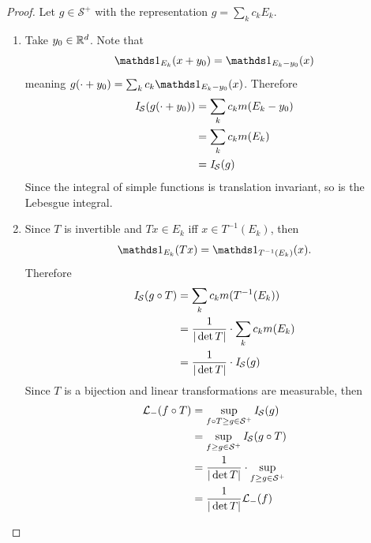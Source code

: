 \documentclass[hw_all.tex]{subfiles}
\begin{document}
\begin{proof}
    Let $g \in \mathcal{S}^+$ with the representation $g = \sum_{k} c_k E_k$.
    \begin{enumerate}
        \item
            Take $y_0 \in \mathbb{R}^d$. Note that
            \[
                \ind{E_k}(x + y_0) = \ind{E_k - y_0}(x)
            \]
            meaning $g(\cdot + y_0) = \sum_k c_k \ind{E_k - y_0}(x)$. Therefore
            \begin{align*}
                \mathit{I}_{\mathcal{S}}(g(\cdot + y_0)) &= \sum_k c_k m(E_k - y_0) \\
                &= \sum_k c_k m(E_k) \\
                &= \mathit{I}_{\mathcal{S}}(g)
            \end{align*}
            Since the integral of simple functions is translation invariant, so is the Lebesgue integral.

        \item 
            Since $T$ is invertible and $Tx \in E_k$ iff $x \in T^{-1}(E_k)$, then
            \[
                \ind{E_k}(Tx) = \ind{T^{-1}(E_k)}(x)
            .\]
            Therefore
            \begin{align*}
                \mathit{I}_{\mathcal{S}}(g \circ T) &= \sum_k c_k m(T^{-1}(E_k)) \\
                                 &= \frac{1}{|\det T|} \cdot \sum_k c_k m(E_k) \\
                                 &= \frac{1}{|\det T|} \cdot \mathit{I}_{\mathcal{S}}(g)
            \end{align*}
            Since $T$ is a bijection and linear transformations are measurable, then
            \begin{align*}
                \mathcal{L}_{-}(f \circ T) &= \sup_{f \circ T \geq g \in \mathcal{S}^+} \mathit{I}_{\mathcal{S}}(g) \\
                &= \sup_{f \geq g \in \mathcal{S}^+} \mathit{I}_{\mathcal{S}}(g \circ T) \\
                &= \frac{1}{|\det T|} \cdot \sup_{f \geq g \in \mathcal{S}^+} \\
                &= \frac{1}{|\det T|}\mathcal{L}_{-}(f)
            \end{align*}


\end{enumerate}
\end{proof}
\end{document}
